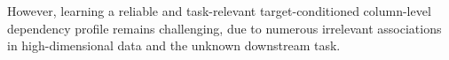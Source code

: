 \documentclass[conference]{IEEEtran}
\newcommand{\done}[1]{{\color{black}#1}}
\newcommand{\zjic}[1]{{\color{black}#1}}
\newcommand{\syic}[1]{{\color{black}#1}}
\begin{document}
However, learning a reliable and task-relevant target-conditioned \zjic{column-level dependency profile} remains challenging, due to numerous irrelevant associations in high-dimensional data and the unknown downstream task.
\end{document}
